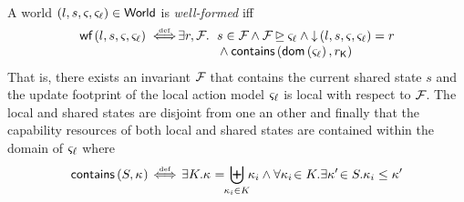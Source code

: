 \begin{definition}
A world $(l, s, \varsigma_{}, \varsigma_{\ell}) \in \textsf{World}$ is \emph{well-formed} iff
%
\[
\begin{array}{l l l}
	\wf{l, s, \amod{}, \amod{\ell}} \iffdef 
	\hspace*{-0.2cm} & \hspace*{-0.2cm}
	\exsts{r, \fence{}} 
	\hspace*{-0.1cm} & \hspace*{-0.1cm} 
		s \in \fence{} \land 
		\fence{} \strictfences \amod{\ell} \land
		\collapseW{l, s, \amod{}, \amod{\ell}} = r\\
	
	\hspace*{-0.2cm} & \hspace*{-0.2cm} 
	& \hspace*{-0.1cm} 	
	\null\land \contains{\dom{\amod{\ell}}}{\capPart{r}}
\end{array}
\]
%
That is, there exists an invariant $\mathcal{F}_{}$ that contains the current shared state $s$ and the update footprint of the local action model $\varsigma_{\ell}$ is local with respect to $\mathcal{F}_{}$. The local and shared states are disjoint from one an other and finally that the capability resources of both local and shared states are contained within the domain of $\varsigma_{\ell}$ where
%
\[
	\contains{S}{\ca{}}\! \iffdef \!
		\exsts{K}\! \ca{} = \!\!\biguplus_{\ca{i} \in K}\!\! \ca{i} \land
		\for{\ca{i} \!\in K}\! \exsts{\ca{}' \!\in S}\! \ca{i} \leq \ca{}'
\]
%
\end{definition}
%
%
%
%
